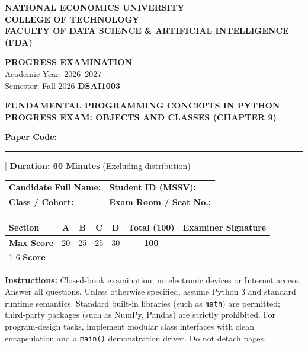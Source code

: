 \documentclass[11pt,a4paper]{article}
\begin{document}
\noindent
\begin{minipage}[t]{0.63\textwidth}\raggedright\small
\textbf{NATIONAL ECONOMICS UNIVERSITY}\\
\textbf{COLLEGE OF TECHNOLOGY}\\
\textbf{FACULTY OF DATA SCIENCE \& ARTIFICIAL INTELLIGENCE (FDA)}
\end{minipage}\hfill
\begin{minipage}[t]{0.35\textwidth}\raggedleft\footnotesize
\textbf{PROGRESS EXAMINATION}\\
Academic Year: 2026--2027\\
Semester: Fall 2026 \quad \textbf{DSAI1003}
\end{minipage}
\vspace{0.1em}
\begin{center}
{\Large\bfseries\color{primaryblue} FUNDAMENTAL PROGRAMMING CONCEPTS IN PYTHON}\\[0.05em]
{\normalsize\bfseries PROGRESS EXAM: OBJECTS AND CLASSES (CHAPTER 9)}\\[0.05em]
{\normalsize\textbf{Paper Code:} \rule{1.5cm}{0.4pt} \quad | \quad \textbf{Duration: 60 Minutes} (Excluding distribution)}
\end{center}
\begin{headerbox}
\begin{tabularx}{\linewidth}{@{}X X@{}}
\textbf{Candidate Full Name:} \dotfill & \textbf{Student ID (MSSV):} \dotfill \\[0.15em]
\textbf{Class / Cohort:} \dotfill & \textbf{Exam Room / Seat No.:} \dotfill
\end{tabularx}
\vspace{1.5mm}
\centering\setlength{\tabcolsep}{4pt}\renewcommand{\arraystretch}{1.05}
\begin{tabular}{|l|c|c|c|c||c|c|}\hline
\textbf{Section} & \textbf{A} & \textbf{B} & \textbf{C} & \textbf{D} & \textbf{Total (100)} & \textbf{Examiner Signature} \\ \hline
\textbf{Max Score} & 20 & 25 & 25 & 30 & \textbf{100} & \\[0.2em] \cline{1-6}
\textbf{Score} & & & & & & \\[0.35em] \hline
\end{tabular}
\vspace{1mm}\raggedright\scriptsize
\textbf{Instructions:} Closed-book examination; no electronic devices or Internet access. Answer all questions. Unless otherwise specified, assume Python 3 and standard runtime semantics. Standard built-in libraries (such as \texttt{math}) are permitted; third-party packages (such as NumPy, Pandas) are strictly prohibited. For program-design tasks, implement modular class interfaces with clean encapsulation and a \texttt{main()} demonstration driver. Do not detach pages.
\end{headerbox}
\end{document}
